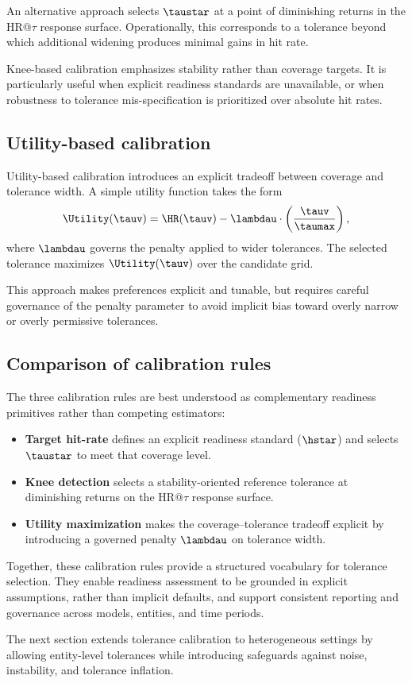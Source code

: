 An alternative approach selects \(\taustar\) at a point of diminishing returns in
the HR@\(\tau\) response surface.
Operationally, this corresponds to a tolerance beyond which additional widening
produces minimal gains in hit rate.

Knee-based calibration emphasizes stability rather than coverage targets.
It is particularly useful when explicit readiness standards are unavailable, or
when robustness to tolerance mis-specification is prioritized over absolute hit
rates.

\subsection{Utility-based calibration}
\label{subsec:utility_calibration}

Utility-based calibration introduces an explicit tradeoff between coverage and
tolerance width.
A simple utility function takes the form
\[
    \Utility(\tauv) = \HR(\tauv) - \lambdau \cdot \left(\frac{\tauv}{\taumax}\right),
\]
where \(\lambdau\) governs the penalty applied to wider tolerances.
The selected tolerance maximizes \(\Utility(\tauv)\) over the candidate grid.

This approach makes preferences explicit and tunable, but requires careful
governance of the penalty parameter to avoid implicit bias toward overly narrow
or overly permissive tolerances.

\subsection{Comparison of calibration rules}
\label{subsec:calibration_comparison}

The three calibration rules are best understood as complementary readiness
primitives rather than competing estimators:

\begin{itemize}[leftmargin=*]
    \item \textbf{Target hit-rate} defines an explicit readiness standard
    (\(\hstar\)) and selects \(\taustar\) to meet that coverage level.

    \item \textbf{Knee detection} selects a stability-oriented reference tolerance
    at diminishing returns on the HR@\(\tau\) response surface.

    \item \textbf{Utility maximization} makes the coverage--tolerance tradeoff
    explicit by introducing a governed penalty \(\lambdau\) on tolerance width.
\end{itemize}

Together, these calibration rules provide a structured vocabulary for tolerance
selection.
They enable readiness assessment to be grounded in explicit assumptions, rather
than implicit defaults, and support consistent reporting and governance across
models, entities, and time periods.

The next section extends tolerance calibration to heterogeneous settings by
allowing entity-level tolerances while introducing safeguards against noise,
instability, and tolerance inflation.
